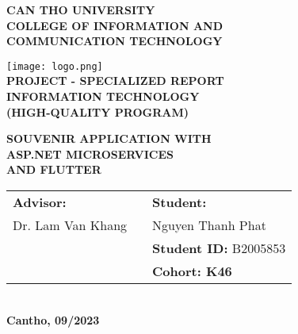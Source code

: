 
\begin{titlepage}
    \begin{center}

        \textbf{CAN THO UNIVERSITY\\}
        \textbf{COLLEGE OF INFORMATION AND\\ COMMUNICATION TECHNOLOGY\\[1cm]}

        \texttt{[image: logo.png]}\\[1cm]

        \textbf{PROJECT - SPECIALIZED REPORT \\}
        \textbf{  INFORMATION TECHNOLOGY \\}
        \textbf{(HIGH-QUALITY PROGRAM)\\[2cm]}

        \textbf{{\Large SOUVENIR APPLICATION WITH\\ASP.NET MICROSERVICES \\ AND FLUTTER}}
        \\[3.5cm]

        \begin{tabular}{ l c l l }
            \textbf{Advisor:} & \hspace{2cm} & \multicolumn{2}{l}{\textbf{Student:}}             \\
            Dr. Lam Van Khang &              & Nguyen Thanh Phat                                 \\
                              &              & \multicolumn{2}{l}{\textbf{Student ID:} B2005853} \\
                              &              & \multicolumn{2}{l}{\textbf{Cohort: K46}}
        \end{tabular}
        \\[4cm]

        \textbf{Cantho, 09/2023}

    \end{center}

\end{titlepage}